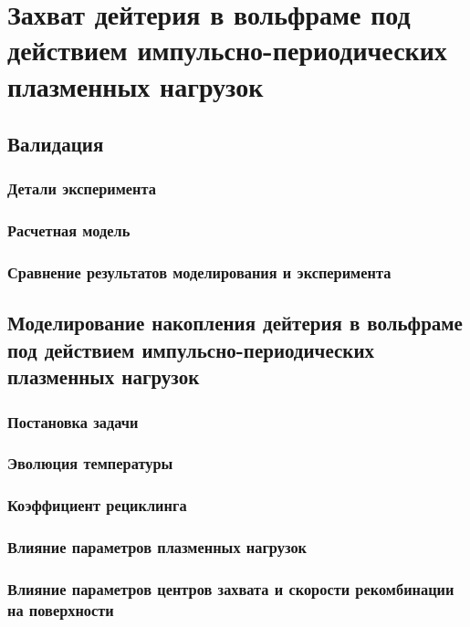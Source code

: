 \chapter{Захват дейтерия в вольфраме под действием импульсно-периодических плазменных нагрузок}\label{ch:ch3}

\section{Валидация}\label{sec:ch3/sec1}
\subsection{Детали эксперимента}\label{sec:ch3/sec1/subsec1}
\subsection{Расчетная модель}\label{sec:ch3/sec1/subsec2}
\subsection{Сравнение результатов моделирования и эксперимента}\label{sec:ch3/sec1/subsec3}

\section{Моделирование накопления дейтерия в вольфраме под действием импульсно-периодических плазменных нагрузок}\label{sec:ch3/sec2}
\subsection{Постановка задачи}\label{sec:ch3/sec2/subsec1}
\subsection{Эволюция температуры}\label{sec:ch3/sec2/subsec2}
\subsection{Коэффициент рециклинга}\label{sec:ch3/sec2/subsec3}
\subsection{Влияние параметров плазменных нагрузок}\label{sec:ch3/sec2/subsec4}
\subsection{Влияние параметров центров захвата и скорости рекомбинации на поверхности}\label{sec:ch3/sec2/subsec5}


